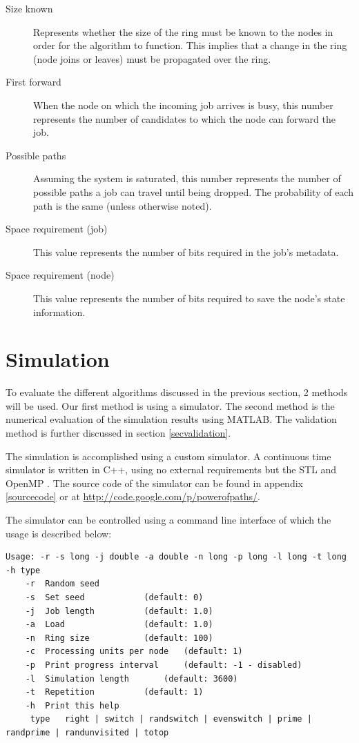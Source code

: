\documentclass[10pt,a4paper]{article}
\begin{document}
\begin{description}
\item[Size known] Represents whether the size of the ring must be known to the nodes in order for the algorithm to function. This implies that a change in the ring (node joins or leaves) must be propagated over the ring.
\item[First forward] When the node on which the incoming job arrives is busy, this number represents the number of candidates to which the node can forward the job.
\item[Possible paths] Assuming the system is saturated, this number represents the number of possible paths a job can travel until being dropped. The probability of each path is the same (unless otherwise noted).
\item[Space requirement (job)] This value represents the number of bits required in the job's metadata.
\item[Space requirement (node)] This value represents the number of bits required to save the node's state information.
\end{description}

\section{Simulation}
\label{secsimulation}
To evaluate the different algorithms discussed in the previous section, 2 methods will be used. Our first method is using a simulator. The second method is the numerical evaluation of the simulation results using MATLAB. The validation method is further discussed in section \ref{secvalidation}.

The simulation is accomplished using a custom simulator. A continuous time simulator is written in C++, using no external requirements but the STL and OpenMP \cite{OPENMP}. The source code of the simulator can be found in appendix \ref{sourcecode} or at \url{http://code.google.com/p/powerofpaths/}.

The simulator can be controlled using a command line interface of which the usage is described below:
\begin{lstlisting}
Usage: -r -s long -j double -a double -n long -p long -l long -t long -h type
	-r	Random seed
	-s	Set seed			(default: 0)
	-j	Job length			(default: 1.0)
	-a	Load				(default: 1.0)
	-n	Ring size			(default: 100)
	-c	Processing units per node	(default: 1)
	-p	Print progress interval		(default: -1 - disabled)
	-l	Simulation length		(default: 3600)
	-t	Repetition			(default: 1)
	-h	Print this help
	 type	right | switch | randswitch | evenswitch | prime | randprime | randunvisited | totop
\end{lstlisting}
\end{document}
